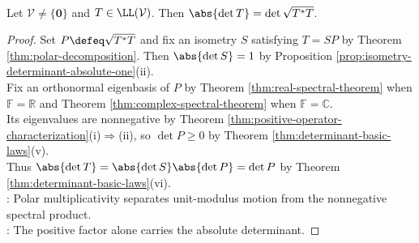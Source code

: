 \begin{proposition} \label{prop:absolute-determinant-positive-polar-factor} \\
Let $\mathcal{V}\neq\{\mathbf{0}\}$ and $T\in\LL(\mathcal{V})$. Then $\abs{\det T}=\det\sqrt{T^*T}$.
\begin{proof}
Set $P\defeq\sqrt{T^*T}$ and fix an isometry $S$ satisfying $T=SP$ by Theorem \ref{thm:polar-decomposition}. Then $\abs{\det S}=1$ by Proposition \ref{prop:isometry-determinant-absolute-one}(ii).\\
Fix an orthonormal eigenbasis of $P$ by Theorem \ref{thm:real-spectral-theorem} when $\mathbb{F}=\mathbb{R}$ and Theorem \ref{thm:complex-spectral-theorem} when $\mathbb{F}=\mathbb{C}$.\\
Its eigenvalues are nonnegative by Theorem \ref{thm:positive-operator-characterization}(i)$\Rightarrow$(ii), so $\det P\geq0$ by Theorem \ref{thm:determinant-basic-laws}(v).\\
Thus $\abs{\det T}=\abs{\det S}\abs{\det P}=\det P$ by Theorem \ref{thm:determinant-basic-laws}(vi).\\
: Polar multiplicativity separates unit-modulus motion from the nonnegative spectral product.\\
: The positive factor alone carries the absolute determinant.
\end{proof}
\end{proposition}
